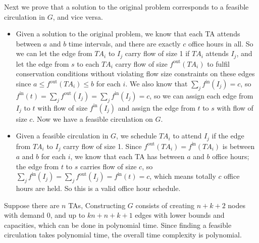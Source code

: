 \documentclass[12pt,letterpaper]{article}
\begin{document}
Next we prove that a solution to the original problem corresponds to a feasible circulation in $G$, and vice versa.
\begin{itemize}
\item Given a solution to the original problem, we know that each TA attends between $a$ and $b$ time intervals, and there are exactly $c$ office hours in all. So we can let the edge from $TA_i$ to $I_j$ carry flow of size 1 if $TA_i$ attends $I_j$, and let the edge from $s$ to each $TA_i$ carry flow of size $f^{\textrm{out}}(TA_i)$ to fulfil conservation conditions without violating flow size constraints on these edges since $a\le f^{\textrm{out}}(TA_i)\le b$ for each $i$. We also know that $\sum_{j}f^{\textrm{in}}(I_j)=c$, so $f^{\textrm{in}}(t)=\sum_{j}f^{\textrm{out}}(I_j)=\sum_{j}f^{\textrm{in}}(I_j)=c$, so we can assign each edge from $I_j$ to $t$ with flow of size $f^{\textrm{in}}(I_j)$ and assign the edge from $t$ to $s$ with flow of size $c$. Now we have a feasible circulation on $G$.
\item Given a feasible circulation in $G$, we schedule $TA_i$ to attend $I_j$ if the edge from $TA_i$ to $I_j$ carry flow of size 1. Since $f^{\textrm{out}}(TA_i)=f^{\textrm{in}}(TA_i)$ is between $a$ and $b$ for each $i$, we know that each TA has between $a$ and $b$ office hours; the edge from $t$ to $s$ carries flow of size $c$, so $\sum_{j}f^{\textrm{in}}(I_j)=\sum_{j}f^{\textrm{out}}(I_j)=f^{\textrm{in}}(t)=c$, which means totally $c$ office hours are held. So this is a valid office hour schedule.
\end{itemize}

Suppose there are $n$ TAs, Constructing $G$ consists of creating $n+k+2$ nodes with demand 0, and up to $kn+n+k+1$ edges with lower bounds and capacities, which can be done in polynomial time. Since finding a feasible circulation takes polynomial time, the overall time complexity is polynomial.
\end{document}
